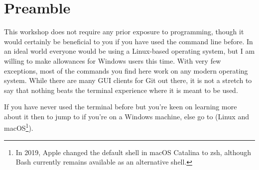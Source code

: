 \section{Preamble}\label{preamble}

\begin{flushleft}
	This workshop does not require any prior exposure to programming, though it would
	certainly be beneficial to you if you have used the command line before. In an ideal
	world everyone would be using a Linux-based operating system, but I am willing to make
	allowances for Windows users this time. With very few exceptions, most of the commands
	you find here work on any modern operating system. While there are many GUI clients for
	Git out there, it is not a stretch to say that nothing beats the terminal experience
	where it is meant to be used.
\end{flushleft}

\begin{flushleft}
	If you have never used the terminal before but you're keen on learning more about it
	then to jump to  if you're on a Windows machine, else go to
	 (Linux and macOS\footnote{In 2019, Apple changed the default shell
		in macOS Catalina to zsh, although Bash currently remains available as an alternative
		shell.}).
\end{flushleft}
